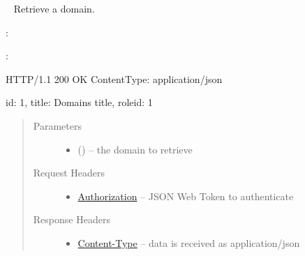 \documentclass[letterpaper,10pt,english]{sphinxmanual}
\begin{document}
\begin{fulllineitems}
\label{\detokenize{resources/domain:get--domains-(domain_id)}}~
Retrieve a domain.

:

\begin{sphinxVerbatim}[commandchars=\\\{\}]
  
 
 
\end{sphinxVerbatim}

:

\begin{sphinxVerbatim}[commandchars=\\\{\}]
HTTP/1.1 200 OK
Content\PYGZhy{}Type: application/json

\PYGZob{}
    \PYGZsq{}id\PYGZsq{}: 1,
    \PYGZsq{}title\PYGZsq{}: \PYGZsq{}Domain\PYGZsq{}s title\PYGZsq{},
    \PYGZsq{}role\PYGZus{}id\PYGZsq{}: 1
\PYGZcb{}
\end{sphinxVerbatim}
\begin{quote}\begin{description}
\item[{Parameters}] \leavevmode\begin{itemize}
\item {} 
 () -- the domain to retrieve

\end{itemize}

\item[{Request Headers}] \leavevmode\begin{itemize}
\item {} 
\href{http://tools.ietf.org/html/rfc7235\#section-4.2}{Authorization} -- JSON Web Token to authenticate

\end{itemize}

\item[{Response Headers}] \leavevmode\begin{itemize}
\item {} 
\href{http://tools.ietf.org/html/rfc7231\#section-3.1.1.5}{Content-Type} -- data is received as application/json


\end{itemize}
\end{description}
\end{quote}
\end{fulllineitems}
\end{document}
